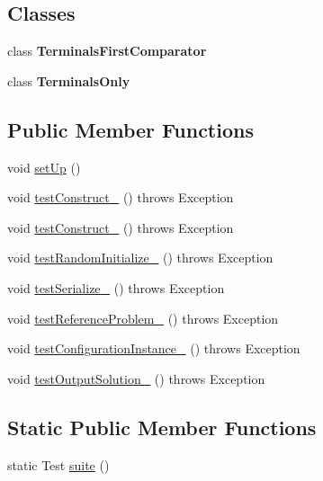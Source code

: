 \subsection*{Classes}
\begin{DoxyCompactItemize}
\item 
class {\bfseries Terminals\-First\-Comparator}
\item 
class {\bfseries Terminals\-Only}
\end{DoxyCompactItemize}
\subsection*{Public Member Functions}
\begin{DoxyCompactItemize}
\item 
void \hyperlink{classorg_1_1jgap_1_1gp_1_1impl_1_1_g_p_genotype_test_a1bbb3dc670947e09b7bfe266b45b96c7}{set\-Up} ()
\item 
void \hyperlink{classorg_1_1jgap_1_1gp_1_1impl_1_1_g_p_genotype_test_a191f9504be855d439323b3ce00c89e9b}{test\-Construct\-\_} ()  throws Exception 
\item 
void \hyperlink{classorg_1_1jgap_1_1gp_1_1impl_1_1_g_p_genotype_test_a9137084c702a1f785a8d7f7eae8c6991}{test\-Construct\-\_} ()  throws Exception 
\item 
void \hyperlink{classorg_1_1jgap_1_1gp_1_1impl_1_1_g_p_genotype_test_ae860fbd282d506fe6826edf28a007db3}{test\-Random\-Initialize\-\_} ()  throws Exception 
\item 
void \hyperlink{classorg_1_1jgap_1_1gp_1_1impl_1_1_g_p_genotype_test_a19ca50bfa7c533479a7838cf5c64a44e}{test\-Serialize\-\_} ()  throws Exception 
\item 
void \hyperlink{classorg_1_1jgap_1_1gp_1_1impl_1_1_g_p_genotype_test_a9859f28f1ef3851173934d7caa515a21}{test\-Reference\-Problem\-\_} ()  throws Exception 
\item 
void \hyperlink{classorg_1_1jgap_1_1gp_1_1impl_1_1_g_p_genotype_test_a6a44b7d272d747e0c6be425ade0bf668}{test\-Configuration\-Instance\-\_} ()  throws Exception 
\item 
void \hyperlink{classorg_1_1jgap_1_1gp_1_1impl_1_1_g_p_genotype_test_a88f408b961c272ea8506f24681f50af6}{test\-Output\-Solution\-\_} ()  throws Exception 
\end{DoxyCompactItemize}
\subsection*{Static Public Member Functions}
\begin{DoxyCompactItemize}
\item 
static Test \hyperlink{classorg_1_1jgap_1_1gp_1_1impl_1_1_g_p_genotype_test_aa4056eb891b22f7bc8cc127765e0be15}{suite} ()
\end{DoxyCompactItemize}
